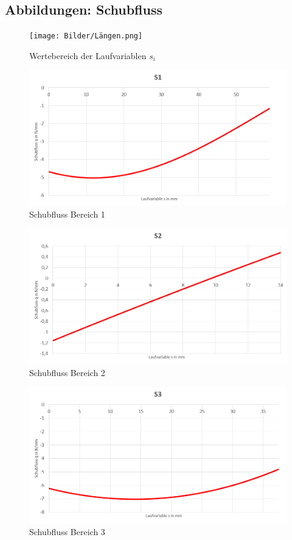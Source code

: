 \subsection{Abbildungen: Schubfluss}
\begin{figure}[h]
	\centering
	\texttt{[image: Bilder/Längen.png]}
	\caption{Wertebereich der Laufvariablen $s_i$}
	\label{fig:LaengenS}
\end{figure}
\begin{figure}[h]
	\includegraphics[width=1.0\textwidth]{Bilder/S1.png}
	\caption{Schubfluss Bereich 1}
	\label{fig:S1}
\end{figure}
\begin{figure}[h]
	\includegraphics[width=1.0\textwidth]{Bilder/S2.png}
	\caption{Schubfluss Bereich 2}
\end{figure}
\begin{figure}[h]
	\includegraphics[width=1.0\textwidth]{Bilder/S3.png}
	\caption{Schubfluss Bereich 3}
\end{figure}
